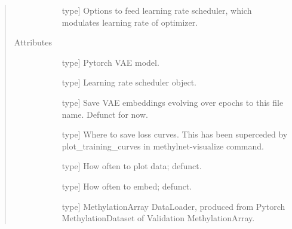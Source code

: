\documentclass[letterpaper,10pt,english]{sphinxmanual}
\begin{document}
\begin{fulllineitems}
\begin{quote}
\begin{description}
\begin{description}
\item[{}] \leavevmode{[}type{]}
Options to feed learning rate scheduler, which modulates learning rate of optimizer.

\end{description}

\item[{Attributes}] \leavevmode\begin{description}
\item[{}] \leavevmode{[}type{]}
Pytorch VAE model.

\item[{}] \leavevmode{[}type{]}
Learning rate scheduler object.

\item[{}] \leavevmode{[}type{]}
Save VAE embeddings evolving over epochs to this file name. Defunct for now.

\item[{}] \leavevmode{[}type{]}
Where to save loss curves. This has been superceded by plot\_training\_curves in methylnet-visualize command.

\item[{}] \leavevmode{[}type{]}
How often to plot data; defunct.

\item[{}] \leavevmode{[}type{]}
How often to embed; defunct.

\item[{}] \leavevmode{[}type{]}
MethylationArray DataLoader, produced from Pytorch MethylationDataset of Validation MethylationArray.

\item[{}] \leavevmode
\item[{}] \leavevmode
\item[{}] \leavevmode
\item[{}] \leavevmode
\item[{}] \leavevmode
\item[{}] \leavevmode
\end{description}

\end{description}\end{quote}

\end{fulllineitems}
\end{document}
